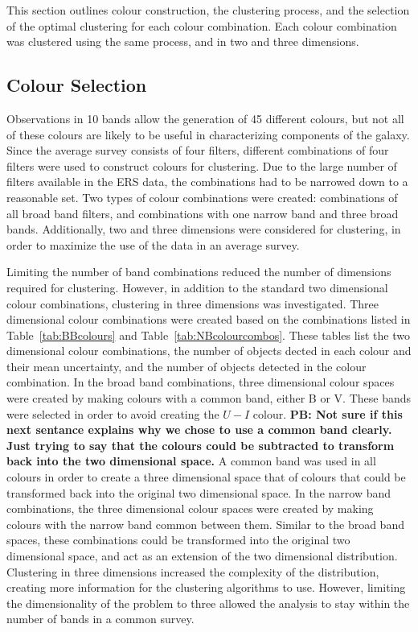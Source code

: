 This section outlines colour construction, the clustering process, and the selection of the optimal clustering for each colour combination.
Each colour combination was clustered using the same process, and in two and three dimensions.

\subsection{Colour Selection}

Observations in 10 bands allow the generation of 45 different colours, but not all of these colours are likely to be useful in characterizing components of the galaxy.
Since the average survey consists of four filters, different combinations of four filters were used to construct colours for clustering. 
Due to the large number of filters available in the ERS data, the combinations had to be narrowed down to a reasonable set.
Two types of colour combinations were created: combinations of all broad band filters, and combinations with one narrow band and three broad bands.
Additionally, two and three dimensions were considered for clustering, in order to maximize the use of the data in an average survey.

Limiting the number of band combinations reduced the number of dimensions required for clustering.
However, in addition to the standard two dimensional colour combinations, clustering in three dimensions was investigated.
Three dimensional colour combinations were created based on the combinations listed in Table~\ref{tab:BBcolours} and Table~\ref{tab:NBcolourcombos}.
These tables list the two dimensional colour combinations, the number of objects dected in each colour and their mean uncertainty, and the number of objects detected in the colour combination.
In the broad band combinations, three dimensional colour spaces were created by making colours with a common band, either B or V.
These bands were selected in order to avoid creating the $U - I$ colour.
\textbf{PB: Not sure if this next sentance explains why we chose to use a common band clearly. Just trying to say that the colours could be subtracted to transform back into the two dimensional space.}
A common band was used in all colours in order to create a three dimensional space that of colours that could be transformed back into the original two dimensional space. 
In the narrow band combinations, the three dimensional colour spaces were created by making colours with the narrow band common between them.
Similar to the broad band spaces, these combinations could be transformed into the original two dimensional space, and act as an extension of the two dimensional distribution.
Clustering in three dimensions increased the complexity of the distribution, creating more information for the clustering algorithms to use.
However, limiting the dimensionality of the problem to three allowed the analysis to stay within the number of bands in a common survey.

